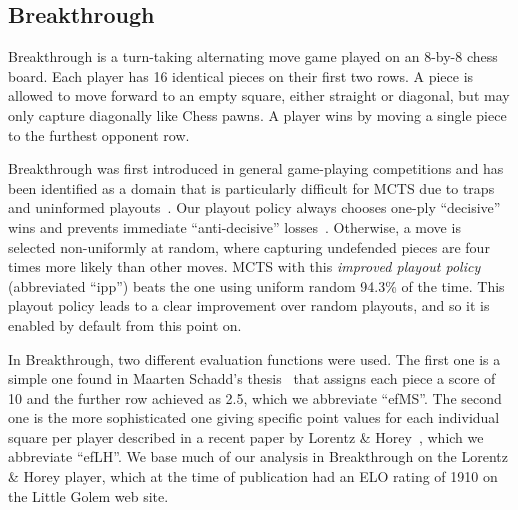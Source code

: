 \documentclass[conference]{IEEEtran}
\newcommand{\Update}{{\sc Update}}
\begin{document}
\subsection{Breakthrough}
\label{sec:bt}

Breakthrough is a turn-taking alternating move game played on an 8-by-8 chess board. Each player 
has 16 identical pieces on their first two rows. 
A piece is allowed to move forward to an empty square, either straight or diagonal, but may only 
capture diagonally like Chess pawns. A player wins by moving a single piece to the furthest opponent row. 

Breakthrough was first introduced in general game-playing competitions and has been identified as a domain 
that is particularly difficult for MCTS due to traps and uninformed playouts~\cite{Gudmundsson13Sufficiency}. 
Our playout policy always chooses one-ply ``decisive'' wins and prevents immediate ``anti-decisive'' 
losses~\cite{Teytaud10On}.
Otherwise, a move is selected non-uniformly at random, where capturing undefended pieces are four times more
likely than other moves. 
MCTS with this {\it improved playout policy} (abbreviated ``ipp'') beats the one using uniform random 
94.3\% of the time. This playout policy leads to a clear improvement over random playouts, and so it is enabled 
by default from this point on.

In Breakthrough, two different evaluation functions were used. The first one is a simple one found in 
Maarten Schadd's thesis~\cite{Schadd11PhdThesis} 
that assigns each piece a score of 10 and the further row achieved as 2.5, which we abbreviate ``efMS''. The second 
one is the more sophisticated one giving specific point values for each individual square per player 
described in a recent paper by Lorentz \& Horey~\cite{Lorentz13Breakthrough}, which we abbreviate ``efLH''. 
We base much of our analysis in Breakthrough on the Lorentz \& Horey player, which 
at the time of publication had an ELO rating of 1910 on the Little Golem web site. 


\end{document}
